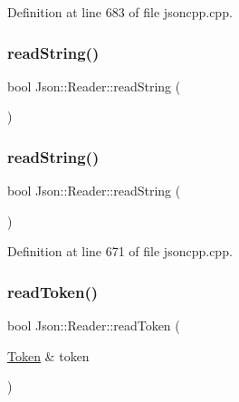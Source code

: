 Definition at line 683 of file jsoncpp.\+cpp.

\hypertarget{class_json_1_1_reader_a6328a0b1994e05118886f9fc9c608643}{}\label{class_json_1_1_reader_a6328a0b1994e05118886f9fc9c608643} 
\subsubsection{\texorpdfstring{read\+String()}{readString()}\hspace{0.1cm}{\footnotesize\ttfamily [1/2]}}
{\footnotesize\ttfamily bool Json\+::\+Reader\+::read\+String (\begin{DoxyParamCaption}{ }\end{DoxyParamCaption})\hspace{0.3cm}{\ttfamily [private]}}

\hypertarget{class_json_1_1_reader_a6328a0b1994e05118886f9fc9c608643}{}\label{class_json_1_1_reader_a6328a0b1994e05118886f9fc9c608643} 
\subsubsection{\texorpdfstring{read\+String()}{readString()}\hspace{0.1cm}{\footnotesize\ttfamily [2/2]}}
{\footnotesize\ttfamily bool Json\+::\+Reader\+::read\+String (\begin{DoxyParamCaption}{ }\end{DoxyParamCaption})\hspace{0.3cm}{\ttfamily [private]}}



Definition at line 671 of file jsoncpp.\+cpp.

\hypertarget{class_json_1_1_reader_a7cb0631963cc0fd4ff6ed0f570976864}{}\label{class_json_1_1_reader_a7cb0631963cc0fd4ff6ed0f570976864} 
\subsubsection{\texorpdfstring{read\+Token()}{readToken()}\hspace{0.1cm}{\footnotesize\ttfamily [1/2]}}
{\footnotesize\ttfamily bool Json\+::\+Reader\+::read\+Token (\begin{DoxyParamCaption}\item[{\hyperlink{class_json_1_1_reader_1_1_token}{Token} \&}]{token }\end{DoxyParamCaption})\hspace{0.3cm}{\ttfamily [private]}}

